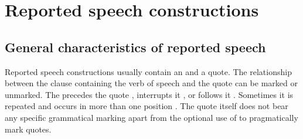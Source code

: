 



\section{Reported speech constructions}
\label{sec:Reported speech constructions}



\subsection{General characteristics of reported speech}
\label{ssec:General characteristics of reported speech}

Reported speech constructions usually contain an  and a quote. The relationship between the clause containing the verb of speech and the quote can be marked or unmarked. The  precedes the quote , interrupts it , or follows it . Sometimes it is repeated and occurs in more than one position . The quote itself does not bear any specific grammatical marking apart from the optional use of   to pragmatically mark quotes.

